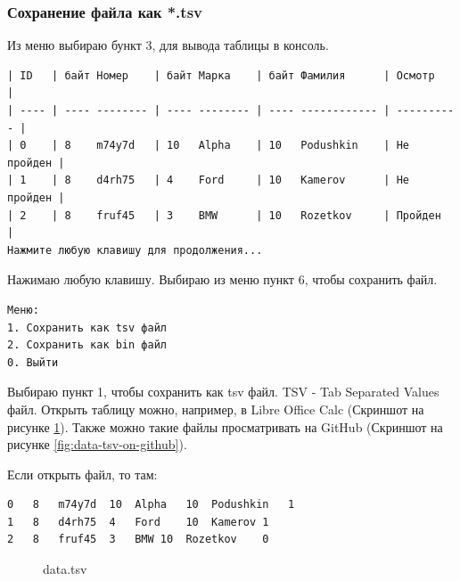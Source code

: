 
\subsubsection{Сохранение файла как *.tsv}

Из меню выбираю бункт 3, для вывода таблицы в консоль.

\begin{tcolorbox}
\begin{verbatim}
| ID   | байт Номер    | байт Марка    | байт Фамилия      | Осмотр     |
| ---- | ---- -------- | ---- -------- | ---- ------------ | ---------- |
| 0    | 8    m74y7d   | 10   Alpha    | 10   Podushkin    | Не пройден |
| 1    | 8    d4rh75   | 4    Ford     | 10   Kamerov      | Не пройден |
| 2    | 8    fruf45   | 3    BMW      | 10   Rozetkov     | Пройден    |
Нажмите любую клавишу для продолжения...
\end{verbatim}
\end{tcolorbox}

Нажимаю любую клавишу. Выбираю из меню пункт 6, чтобы сохранить файл.

\begin{tcolorbox}
\begin{verbatim}
Меню:
1. Сохранить как tsv файл
2. Сохранить как bin файл
0. Выйти
\end{verbatim}
\end{tcolorbox}

Выбираю пункт 1, чтобы сохранить как tsv файл. TSV - Tab Separated Values файл. Открыть таблицу можно, например, в Libre Office Calc (Скриншот на рисунке \ref{fig:data-tsv}). Также можно такие файлы просматривать на GitHub (Скриншот на рисунке \ref{fig:data-tsv-on-github}).

Если открыть файл, то там:
\begin{tcolorbox}
\begin{verbatim}
0	8	m74y7d	10	Alpha	10	Podushkin	1
1	8	d4rh75	4	Ford	10	Kamerov	1
2	8	fruf45	3	BMW	10	Rozetkov	0
\end{verbatim}
\end{tcolorbox}

\begin{figure}[h]
    \caption{data.tsv}
    \label{fig:data-tsv}
\end{figure}

